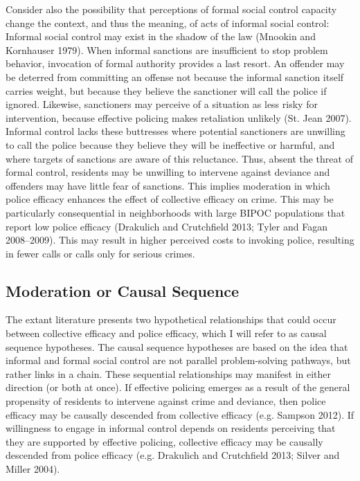 \documentclass [11pt, proquest] {uwthesis}[2015/03/03]
\begin{document}
Consider also the possibility that perceptions of formal social control capacity change the context, and thus the meaning, of acts of informal social control: Informal social control may exist in the shadow of the law (Mnookin and Kornhauser 1979). When informal sanctions are insufficient to stop problem behavior, invocation of formal authority provides a last resort. An offender may be deterred from committing an offense not because the informal sanction itself carries weight, but because they believe the sanctioner will call the police if ignored. Likewise, sanctioners may perceive of a situation as less risky for intervention, because effective policing makes retaliation unlikely (St. Jean 2007). Informal control lacks these buttresses where potential sanctioners are unwilling to call the police because they believe they will be ineffective or harmful, and where targets of sanctions are aware of this reluctance. Thus, absent the threat of formal control, residents may be unwilling to intervene against deviance and offenders may have little fear of sanctions. This implies moderation in which police efficacy enhances the effect of collective efficacy on crime. This may be particularly consequential in neighborhoods with large BIPOC populations that report low police efficacy (Drakulich and Crutchfield 2013; Tyler and Fagan 2008--2009). This may result in higher perceived costs to invoking police, resulting in fewer calls or calls only for serious crimes.

\hypertarget{moderation-or-causal-sequence}{%
\subsection{Moderation or Causal Sequence}\label{moderation-or-causal-sequence}}

The extant literature presents two hypothetical relationships that could occur between collective efficacy and police efficacy, which I will refer to as causal sequence hypotheses. The causal sequence hypotheses are based on the idea that informal and formal social control are not parallel problem-solving pathways, but rather links in a chain. These sequential relationships may manifest in either direction (or both at once). If effective policing emerges as a result of the general propensity of residents to intervene against crime and deviance, then police efficacy may be causally descended from collective efficacy (e.g. Sampson 2012). If willingness to engage in informal control depends on residents perceiving that they are supported by effective policing, collective efficacy may be causally descended from police efficacy (e.g. Drakulich and Crutchfield 2013; Silver and Miller 2004).
\end{document}

